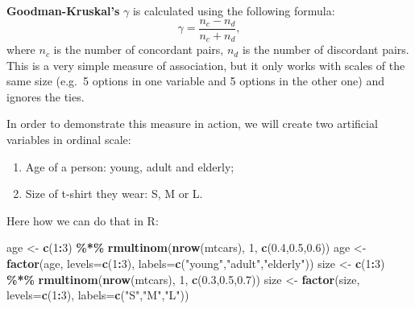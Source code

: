 \documentclass[
]{book}
\newenvironment{Shaded}{\begin{snugshade}}{\end{snugshade}}
\newcommand{\DataTypeTok}[1]{\textcolor[rgb]{0.13,0.29,0.53}{#1}}
\newcommand{\DecValTok}[1]{\textcolor[rgb]{0.00,0.00,0.81}{#1}}
\newcommand{\FloatTok}[1]{\textcolor[rgb]{0.00,0.00,0.81}{#1}}
\newcommand{\KeywordTok}[1]{\textcolor[rgb]{0.13,0.29,0.53}{\textbf{#1}}}
\newcommand{\NormalTok}[1]{#1}
\newcommand{\OperatorTok}[1]{\textcolor[rgb]{0.81,0.36,0.00}{\textbf{#1}}}
\newcommand{\StringTok}[1]{\textcolor[rgb]{0.31,0.60,0.02}{#1}}
\providecommand{\tightlist}{%
  \setlength{\itemsep}{0pt}\setlength{\parskip}{0pt}}
\theoremstyle{definition}
\theoremstyle{definition}
\theoremstyle{definition}
\theoremstyle{definition}
\theoremstyle{remark}
\begin{document}
\textbf{Goodman-Kruskal's} \(\gamma\) is calculated using the following formula:
\begin{equation}
    \gamma = \frac{n_c - n_d}{n_c + n_d},
    \label{eq:measuresAssociationGoodman}
\end{equation}
where \(n_c\) is the number of concordant pairs, \(n_d\) is the number of discordant pairs. This is a very simple measure of association, but it only works with scales of the same size (e.g.~5 options in one variable and 5 options in the other one) and ignores the ties.

In order to demonstrate this measure in action, we will create two artificial variables in ordinal scale:

\begin{enumerate}
\def\labelenumi{\arabic{enumi}.}
\tightlist
\item
  Age of a person: young, adult and elderly;
\item
  Size of t-shirt they wear: S, M or L.
\end{enumerate}

Here how we can do that in R:

\begin{Shaded}
\begin{Highlighting}[]
\NormalTok{age \textless{}{-}}\StringTok{ }\KeywordTok{c}\NormalTok{(}\DecValTok{1}\OperatorTok{:}\DecValTok{3}\NormalTok{) }\OperatorTok{\%*\%}\StringTok{ }\KeywordTok{rmultinom}\NormalTok{(}\KeywordTok{nrow}\NormalTok{(mtcars), }\DecValTok{1}\NormalTok{,}
                               \KeywordTok{c}\NormalTok{(}\FloatTok{0.4}\NormalTok{,}\FloatTok{0.5}\NormalTok{,}\FloatTok{0.6}\NormalTok{))}
\NormalTok{age \textless{}{-}}\StringTok{ }\KeywordTok{factor}\NormalTok{(age, }\DataTypeTok{levels=}\KeywordTok{c}\NormalTok{(}\DecValTok{1}\OperatorTok{:}\DecValTok{3}\NormalTok{),}
                 \DataTypeTok{labels=}\KeywordTok{c}\NormalTok{(}\StringTok{"young"}\NormalTok{,}\StringTok{"adult"}\NormalTok{,}\StringTok{"elderly"}\NormalTok{))}
\NormalTok{size \textless{}{-}}\StringTok{ }\KeywordTok{c}\NormalTok{(}\DecValTok{1}\OperatorTok{:}\DecValTok{3}\NormalTok{) }\OperatorTok{\%*\%}\StringTok{ }\KeywordTok{rmultinom}\NormalTok{(}\KeywordTok{nrow}\NormalTok{(mtcars), }\DecValTok{1}\NormalTok{,}
                               \KeywordTok{c}\NormalTok{(}\FloatTok{0.3}\NormalTok{,}\FloatTok{0.5}\NormalTok{,}\FloatTok{0.7}\NormalTok{))}
\NormalTok{size \textless{}{-}}\StringTok{ }\KeywordTok{factor}\NormalTok{(size, }\DataTypeTok{levels=}\KeywordTok{c}\NormalTok{(}\DecValTok{1}\OperatorTok{:}\DecValTok{3}\NormalTok{),}
                 \DataTypeTok{labels=}\KeywordTok{c}\NormalTok{(}\StringTok{"S"}\NormalTok{,}\StringTok{"M"}\NormalTok{,}\StringTok{"L"}\NormalTok{))}
\end{Highlighting}
\end{Shaded}
\end{document}

